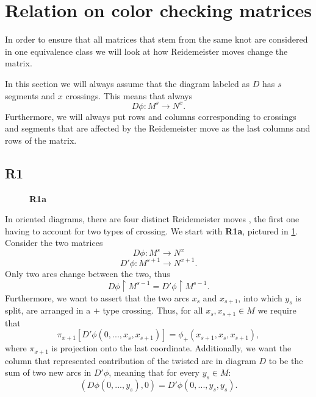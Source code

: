 \section{Relation on color checking matrices}

In order to ensure that all matrices that stem from the same knot are considered in one equivalence class we will look at how Reidemeister moves change the matrix. 

In this section we will always assume that the diagram labeled as $D$ has $s$ segments and $x$ crossings. This means that always 
$$D\phi:M^s \to N^x.$$
Furthermore, we will always put rows and columns corresponding to crossings and segments that are affected by the Reidemeister move as the last columns and rows of the matrix.

\subsection*{\centering R1}

\def\bracketL{[}
\def\bracketR{]}
\renewcommand{\figurename}{}
\captionsetup{labelformat=empty}

\begin{figure}[h!]\centering 
  \caption{\textbf{R1a}\label{R1a}}
  \medskip

\end{figure}

In oriented diagrams, there are four distinct Reidemeister moves \cite{ruchy_zorientowane}, the first one having to account for two types of crossing. We start with \textbf{R1a}, pictured in \cref{R1a}. Consider the two matrices 
$$D\phi:M^s\to N^x$$ 
$$D'\phi:M^{s+1}\to N^{x+1}.$$
Only two arcs change between the two, thus 
$$D\phi\restriction M^{s-1}=D'\phi\restriction M^{s-1}.$$
Furthermore, we want to assert that the two arcs $x_s$ and $x_{s+1}$, into which $y_s$ is split, are arranged in a $+$ type crossing. Thus, for all $x_s, x_{s+1}\in M$ we require that
$$\pi_{x+1}[D'\phi(0,..., x_s, x_{s+1})]=\phi_+(x_{s+1},x_s,x_{s+1}),$$
where $\pi_{x+1}$ is projection onto the last coordinate. 
Additionally, we want the column that represented contribution of the twisted arc in diagram $D$ to be the sum of two new arcs in $D'\phi$, meaning that for every $y_s\in M$:
$$(D\phi(0,..., y_s), 0)=D'\phi(0,..., y_s, y_s).$$

